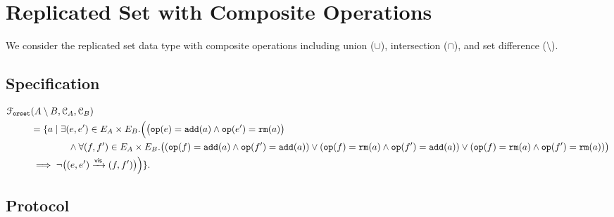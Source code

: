 
\section{Replicated Set with Composite Operations}

We consider the replicated set data type with composite operations 
including union ($\cup$), intersection ($\cap$), and set difference ($\setminus$).

\subsection{Specification}	\label{ss:rset-composite-spec}


\begin{align}
  \mathcal{F}_{\texttt{orset}}&(A \setminus B, \mathcal{C}_{A}, \mathcal{C}_{B}) \\
  &= \{ a \mid \exists (e, e') \in E_A \times E_B. 
  	\Big( \big(\texttt{op}(e) = \texttt{add}(a) \land \texttt{op}(e') = \texttt{rm}(a)\big) \\
      	    &\qquad\qquad \land \forall (f, f') \in E_A \times E_B. 
      	        \big( (\texttt{op}(f) = \texttt{add}(a) \land \texttt{op}(f') = \texttt{add}(a)) 
		      \lor (\texttt{op}(f) = \texttt{rm}(a) \land \texttt{op}(f') = \texttt{add}(a)) 
		      \lor (\texttt{op}(f) = \texttt{rm}(a) \land \texttt{op}(f') = \texttt{rm}(a)) 
		\big) \\
	    & \implies \lnot \big((e, e') \xrightarrow{\textsf{vis}} (f, f')\big)
	\Big)
	      \}.
\end{align}

\subsection{Protocol}		\label{ss:rset-composite-protocol}
